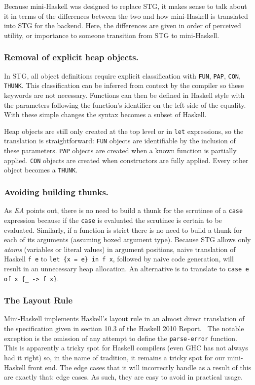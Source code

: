 \documentclass{llncs}
\begin{document}
Because mini-Haskell was designed to replace STG, it makes sense to talk about
it in terms of the differences between the two and how mini-Haskell is
translated into STG for the backend.  Here, the differences are given in order
of perceived utility, or importance to someone transition from STG to
mini-Haskell.

\subsubsection{Removal of explicit heap objects.}
In STG, all object definitions require explicit classification with
\texttt{FUN}, \texttt{PAP}, \texttt{CON}, \texttt{THUNK}. This classification can be
inferred from context by the compiler so these keywords are not necessary.
Functions can then be defined in Haskell style with the parameters following
the function's identifier on the left side of the equality. With these simple
changes the syntax becomes a subset of Haskell.

Heap objects are still only created at the top level or in \texttt{let}
expressions, so the translation is straightforward: \texttt{FUN} objects are
identifiable by the inclusion of these parameters.  \texttt{PAP} objects are
created when a known function is partially applied.  \texttt{CON} objects are
created when constructors are fully applied.  Every other object becomes a
\texttt{THUNK}.

\subsubsection{Avoiding building thunks.}
As \emph{EA} points out, there is no need to build a thunk for the scrutinee
of a \texttt{case} expression because if the \texttt{case} is evaluated the
scrutinee is certain to be evaluated.  Similarly, if a function is strict
there is no need to build a thunk for each of its arguments (assuming boxed
argument type).  Because STG allows only \emph{atoms} (variables or literal
values) in argument positions, naive translation of Haskell \texttt{f e} to
\texttt{let \{x = e\} in f x}, followed by naive code generation, will result in
an unnecessary heap allocation.  An alternative is to translate to
\texttt{case e of x \{\_ -> f x\}}.

\subsubsection{The Layout Rule}
Mini-Haskell implements Haskell's layout rule in an almost direct translation
of the specification given in section 10.3 of the Haskell 2010
Report.~\cite{haskell2010report} The notable exception is the omission of any
attempt to define the \texttt{parse-error} function.  This is apparently a
tricky spot for Haskell compilers (even GHC has not always had it right) so,
in the name of tradition, it remains a tricky spot for our mini-Haskell front
end.  The edge cases that it will incorrectly handle as a result of this are
exactly that: edge cases.  As such, they are easy to avoid in practical usage.
\end{document}
